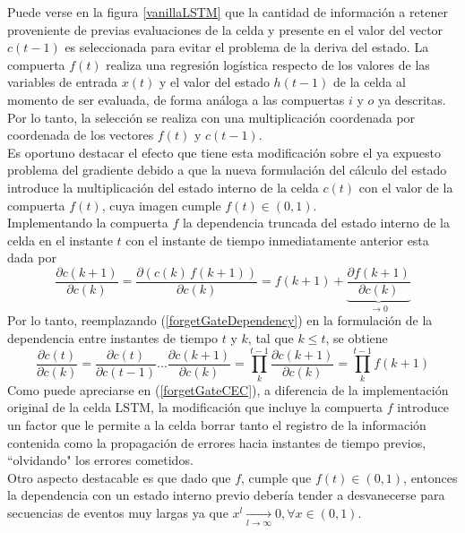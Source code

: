 \documentclass{article}
\begin{document}
	Puede verse en la figura \ref{vanillaLSTM} que la cantidad de información a retener proveniente de previas evaluaciones de la celda y presente en el valor del vector $c(t-1)$ es seleccionada para evitar el problema de la deriva del estado. La compuerta $f(t)$ realiza una regresión logística respecto de los valores de las variables de entrada $x(t)$ y el valor del estado $h(t-1)$ de la celda al momento de ser evaluada, de forma análoga a las compuertas $i$ y $o$ ya descritas. Por lo tanto, la selección se realiza con una multiplicación coordenada por coordenada de los vectores $f(t)$ y $c(t-1)$.\\
	
	Es oportuno destacar el efecto que tiene esta modificación sobre el ya expuesto problema del gradiente debido a que la nueva formulación del cálculo del estado introduce la multiplicación del estado interno de la celda $c(t)$ con el valor de la compuerta $f(t)$, cuya imagen cumple $f(t) \in (0, 1)$.\\
	Implementando la compuerta $f$ la dependencia truncada del estado interno de la celda en el instante $t$ con el instante de tiempo inmediatamente anterior esta dada por
	\begin{equation}\label{forgetGateDependency}
	\dfrac{\partial c(k+1)}{\partial c(k)} = \dfrac{\partial (c(k) \, f(k+1))}{\partial c(k)} = f(k+1) + \underbrace{\dfrac{\partial f(k+1)}{\partial c(k)}}_{\rightarrow 0}
	\end{equation}
	Por lo tanto, reemplazando (\ref{forgetGateDependency}) en la formulación de la dependencia entre instantes de tiempo $t$ y $k$, tal que $k \le t$, se obtiene
	\begin{equation}\label{forgetGateCEC}
	\dfrac{\partial c(t)}{\partial c(k)} = \dfrac{\partial c(t)}{\partial c(t-1)} ... \dfrac{\partial c(k+1)}{\partial c(k)} = \prod_{k}^{t-1} \dfrac{\partial c(k+1)}{\partial c(k)} = \prod_{k}^{t-1} f(k+1)
	\end{equation}
	Como puede apreciarse en (\ref{forgetGateCEC}), a diferencia de la implementación original de la celda LSTM, la modificación que incluye la compuerta $f$ introduce un factor que le permite a la celda borrar tanto el registro de la información contenida como la propagación de errores hacia instantes de tiempo previos, ``olvidando" los errores cometidos.\\
	Otro aspecto destacable es que dado que $f$, cumple que $f(t) \in (0, 1)$, entonces la dependencia con un estado interno previo debería tender a desvanecerse para secuencias de eventos muy largas ya que $x^l \xrightarrow[l \to \infty]{} 0, \forall x \in (0,1)$. \\
\end{document}
